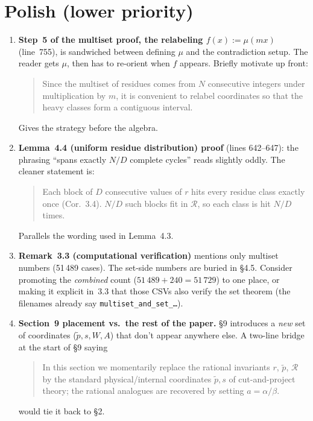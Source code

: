 \documentclass[11pt]{article}
\begin{document}
\section*{Polish (lower priority)}

\begin{enumerate}[label=\textbf{\arabic*.}, start=5]
    \item \textbf{Step~5 of the multiset proof, the relabeling
    \(f(x):=\mu(mx)\)} (line~755), is sandwiched between defining
    \(\mu\) and the contradiction setup.  The reader gets \(\mu\), then
    has to re-orient when \(f\) appears.  Briefly motivate up front:
    \begin{quote}
    Since the multiset of residues comes from \(N\) consecutive integers
    under multiplication by \(m\), it is convenient to relabel
    coordinates so that the heavy classes form a contiguous interval.
    \end{quote}
    Gives the strategy before the algebra.

    \item \textbf{Lemma~4.4 (uniform residue distribution) proof}
    (lines 642--647): the phrasing ``spans exactly \(N/D\) complete
    cycles'' reads slightly oddly.  The cleaner statement is:
    \begin{quote}
    Each block of \(D\) consecutive values of \(r\) hits every residue
    class exactly once (Cor.~3.4).  \(N/D\) such blocks fit in
    \(\mathcal{R}\), so each class is hit \(N/D\) times.
    \end{quote}
    Parallels the wording used in Lemma~4.3.

    \item \textbf{Remark~3.3 (computational verification)} mentions only
    multiset numbers (51\,489 cases).  The set-side numbers are buried
    in \S4.5.  Consider promoting the \emph{combined} count
    (\(51\,489 + 240 = 51\,729\)) to one place, or making it explicit
    in~3.3 that those CSVs also verify the set theorem (the filenames
    already say \texttt{multiset\_and\_set\_\ldots}).

    \item \textbf{Section~9 placement vs.\ the rest of the paper.}\quad
    \S9 introduces a \emph{new} set of coordinates
    (\(\tilde p, s, W, A\)) that don't appear anywhere else.  A two-line
    bridge at the start of \S9 saying
    \begin{quote}
    In this section we momentarily replace the rational invariants
    \(r\), \(\tilde p\), \(\mathcal{R}\) by the standard
    physical/internal coordinates \(\tilde p, s\) of cut-and-project
    theory; the rational analogues are recovered by setting
    \(a = \alpha/\beta\).
    \end{quote}
    would tie it back to \S2.
\end{enumerate}
\end{document}
